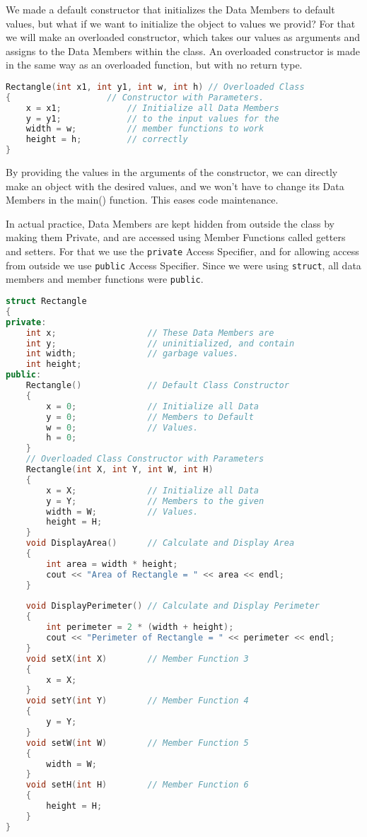 \documentclass[11pt,fleqn]{book} %
\begin{document}
\noindent We made a default constructor that initializes the Data Members to default values, but what if we want to initialize the object to values we provid? For that we will make an overloaded constructor, which takes our values as arguments and assigns to the Data Members within the class. An overloaded constructor is made in the same way as an overloaded function, but with no return type.

\begin{lstlisting}[language=C++, caption={Overloaded Constructor, to be defined inside the Class Body}]
Rectangle(int x1, int y1, int w, int h) // Overloaded Class  
{                   // Constructor with Parameters.
	x = x1;             // Initialize all Data Members
	y = y1;             // to the input values for the 
	width = w;          // member functions to work
	height = h;         // correctly
}
\end{lstlisting}

\noindent By providing the values in the arguments of the constructor, we can directly make an object with the desired values, and we won't have to change its Data Members in the main() function. This eases code maintenance.

\noindent In actual practice, Data Members are kept hidden from outside the class by making them Private, and are accessed using Member Functions called getters and setters. For that we use the \texttt{private} Access Specifier, and for allowing access from outside we use \texttt{public} Access Specifier. Since we were using \texttt{struct}, all data members and member functions were \texttt{public}.

\begin{lstlisting}[language=C++, caption=Class Definition using the \texttt{struct} keyword in C++]
struct Rectangle
{
private:
    int x;                  // These Data Members are
    int y;                  // uninitialized, and contain
    int width;              // garbage values.
    int height;            
public:
    Rectangle()             // Default Class Constructor
    {
        x = 0;              // Initialize all Data
        y = 0;              // Members to Default
        w = 0;              // Values.
        h = 0;
    }
    // Overloaded Class Constructor with Parameters
    Rectangle(int X, int Y, int W, int H)
    {
        x = X;              // Initialize all Data
        y = Y;              // Members to the given
        width = W;          // Values.
        height = H;
    }
    void DisplayArea()      // Calculate and Display Area
    {
        int area = width * height;
        cout << "Area of Rectangle = " << area << endl;
    }
  
    void DisplayPerimeter() // Calculate and Display Perimeter
    {
        int perimeter = 2 * (width + height);
        cout << "Perimeter of Rectangle = " << perimeter << endl;
    }
    void setX(int X)        // Member Function 3
    {
        x = X;
    }
    void setY(int Y)        // Member Function 4
    {
        y = Y;
    }
    void setW(int W)        // Member Function 5
    {
        width = W;
    }
    void setH(int H)        // Member Function 6
    {
        height = H;
    }
}
\end{lstlisting}
\end{document}
